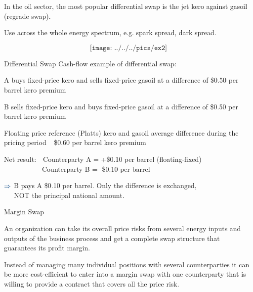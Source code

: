 	In the oil sector, the most popular differential swap is the jet kero against gasoil (regrade swap).


	Use across the whole energy spectrum, e.g. spark spread, dark spread.


	
$$\texttt{[image: ../../../pics/ex2]}$$





{Differential Swap}
\textcolor[rgb]{0.00,0.25,0.50}{Cash-flow example of differential swap:}






	
A buys fixed-price kero and sells fixed-price gasoil at a difference of \$0.50 per barrel kero premium


	B sells fixed-price kero and buys fixed-price gasoil at a difference of \$0.50 per barrel kero premium


	Floating price reference (Platts) kero and gasoil average difference during the pricing period $\;\,$ \$0.60 per barrel kero premium


	
\textcolor[rgb]{0.00,0.25,0.50}{Net result:}$\quad$Counterparty A = +\$0.10 per barrel (floating-fixed)\\
$\qquad\qquad\quad\,$  Counterparty B = -\$0.10 per barrel


	
$\textcolor[rgb]{0.00,0.25,0.50}{\Rightarrow}$ B pays A \$0.10 per barrel. Only the difference is exchanged,\\
$\quad\;\,$NOT the principal national amount.






{Margin Swap}






	
An organization can take its overall price risks from several energy inputs and outputs of the business process and get a complete swap structure that guarantees its profit margin.


	Instead of managing many individual positions with several counterparties it can be more cost-efficient to enter into a margin swap with one counterparty that is willing to provide a contract that covers all the price risk.


